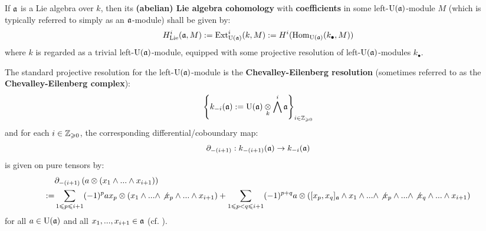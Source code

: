         \begin{definition} \label{def: lie_algebra_cohomology}
            If $\mathfrak{a}$ is a Lie algebra over $k$, then its \textbf{(abelian) Lie algebra cohomology} with \textbf{coefficients} in some left-$\mathrm{U}(\mathfrak{a})$-module $M$ (which is typically referred to simply as an $\mathfrak{a}$-module) shall be given by:
                $$H^i_{\mathrm{Lie}}(\mathfrak{a}, M) := \mathrm{Ext}^i_{\mathrm{U}(\mathfrak{a})}(k, M) := H^i( \mathrm{Hom}_{\mathrm{U}(\mathfrak{a})}(k_{\bullet}, M) )$$
            where $k$ is regarded as a trivial left-$\mathrm{U}(\mathfrak{a})$-module, equipped with some projective resolution of left-$\mathrm{U}(\mathfrak{a})$-modules $k_{\bullet}$.

            The standard projective resolution for the left-$\mathrm{U}(\mathfrak{a})$-module is the \textbf{Chevalley-Eilenberg resolution} (sometimes referred to as the \textbf{Chevalley-Eilenberg complex}):
                $$\left\{ k_{-i}(\a) := \rmU(\a) \tensor_k \bigwedge^i \a \right\}_{i \in \Z_{\geq 0}}$$
            and for each $i \in \mathbb{Z}_{\geqslant 0}$, the corresponding differential/coboundary map:
                $$\partial_{-(i + 1)}: k_{-(i + 1)}(\mathfrak{a}) \to k_{-i}(\mathfrak{a})$$
            is given on pure tensors by:
                $$
                    \begin{aligned}
                        & \del_{-(i + 1)}\left( a \tensor (x_1 \wedge ... \wedge x_{i + 1}) \right)
                        \\
                        := & \sum_{1 \leq p \leq i + 1} (-1)^p a x_p \tensor (x_1 \wedge ... \wedge \not{x_p} \wedge ... \wedge x_{i + 1}) + \sum_{1 \leq p < q \leq i + 1} (-1)^{p + q} a \tensor ( [x_p, x_q]_{\a} \wedge x_1 \wedge ... \wedge \not{x_p} \wedge ... \wedge \not{x_q} \wedge ... \wedge x_{i + 1})
                    \end{aligned}
                $$
            for all $a \in \mathrm{U}(\mathfrak{a})$ and all $x_1, ..., x_{i + 1} \in \mathfrak{a}$ (cf. \cite[Section VII.4]{hilton_stammbach_homological_algebra}).
        \end{definition}
